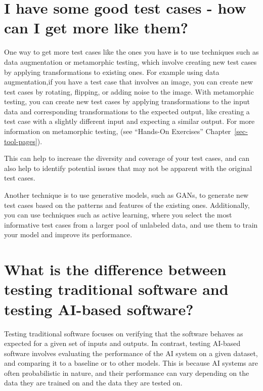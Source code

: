 \documentclass[
  letterpaper,
  DIV=11,
  numbers=noendperiod,
  oneside]{scrreprt}
\begin{document}
\section*{I have some good test cases - how can I get more like
them?}\label{i-have-some-good-test-cases---how-can-i-get-more-like-them}


One way to get more test cases like the ones you have is to use
techniques such as data augmentation or metamorphic testing, which
involve creating new test cases by applying transformations to existing
ones. For example using data augmentation,if you have a test case that
involves an image, you can create new test cases by rotating, flipping,
or adding noise to the image. With metamorphic testing, you can create
new test cases by applying transformations to the input data and
corresponding transformations to the expected output, like creating a
test case with a slightly different input and expecting a similar
output. For more information on metamorphic testing, (see ``Hands-On
Exercises'' Chapter~\ref{sec-tool-pages}).

This can help to increase the diversity and coverage of your test cases,
and can also help to identify potential issues that may not be apparent
with the original test cases.

Another technique is to use generative models, such as GANs, to generate
new test cases based on the patterns and features of the existing ones.
Additionally, you can use techniques such as active learning, where you
select the most informative test cases from a larger pool of unlabeled
data, and use them to train your model and improve its performance.

\section*{What is the difference between testing traditional software
and testing AI-based
software?}\label{what-is-the-difference-between-testing-traditional-software-and-testing-ai-based-software}


Testing traditional software focuses on verifying that the software
behaves as expected for a given set of inputs and outputs. In contrast,
testing AI-based software involves evaluating the performance of the AI
system on a given dataset, and comparing it to a baseline or to other
models. This is because AI systems are often probabilistic in nature,
and their performance can vary depending on the data they are trained on
and the data they are tested on.
\end{document}

